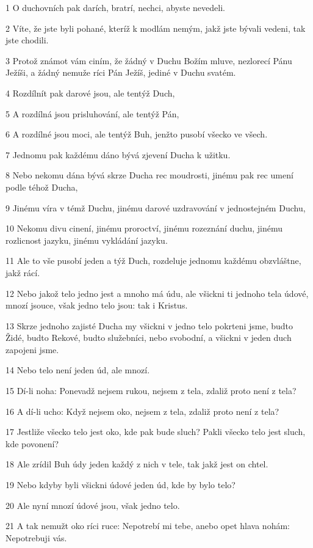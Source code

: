 \par 1 O duchovních pak darích, bratrí, nechci, abyste nevedeli.
\par 2 Víte, že jste byli pohané, kteríž k modlám nemým, jakž jste bývali vedeni, tak jste chodili.
\par 3 Protož známot vám ciním, že žádný v Duchu Božím mluve, nezlorecí Pánu Ježíši, a žádný nemuže ríci Pán Ježíš, jediné v Duchu svatém.
\par 4 Rozdílnít pak darové jsou, ale tentýž Duch,
\par 5 A rozdílná jsou prisluhování, ale tentýž Pán,
\par 6 A rozdílné jsou moci, ale tentýž Buh, jenžto pusobí všecko ve všech.
\par 7 Jednomu pak každému dáno bývá zjevení Ducha k užitku.
\par 8 Nebo nekomu dána bývá skrze Ducha rec moudrosti, jinému pak rec umení podle téhož Ducha,
\par 9 Jinému víra v témž Duchu, jinému darové uzdravování v jednostejném Duchu,
\par 10 Nekomu divu cinení, jinému proroctví, jinému rozeznání duchu, jinému rozlicnost jazyku, jinému vykládání jazyku.
\par 11 Ale to vše pusobí jeden a týž Duch, rozdeluje jednomu každému obzvláštne, jakž rácí.
\par 12 Nebo jakož telo jedno jest a mnoho má údu, ale všickni ti jednoho tela údové, mnozí jsouce, však jedno telo jsou: tak i Kristus.
\par 13 Skrze jednoho zajisté Ducha my všickni v jedno telo pokrteni jsme, budto Židé, budto Rekové, budto služebníci, nebo svobodní, a všickni v jeden duch zapojeni jsme.
\par 14 Nebo telo není jeden úd, ale mnozí.
\par 15 Dí-li noha: Ponevadž nejsem rukou, nejsem z tela, zdaliž proto není z tela?
\par 16 A dí-li ucho: Když nejsem oko, nejsem z tela, zdaliž proto není z tela?
\par 17 Jestliže všecko telo jest oko, kde pak bude sluch? Pakli všecko telo jest sluch, kde povonení?
\par 18 Ale zrídil Buh údy jeden každý z nich v tele, tak jakž jest on chtel.
\par 19 Nebo kdyby byli všickni údové jeden úd, kde by bylo telo?
\par 20 Ale nyní mnozí údové jsou, však jedno telo.
\par 21 A tak nemužt oko ríci ruce: Nepotrebí mi tebe, anebo opet hlava nohám: Nepotrebuji vás.
